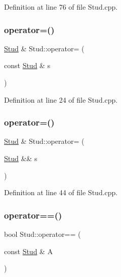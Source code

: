 Definition at line 76 of file Stud.\+cpp.

\mbox{\label{class_stud_a94d010cba4832e52eea069005bf7db04}} 
\subsubsection{\texorpdfstring{operator=()}{operator=()}\hspace{0.1cm}{\footnotesize\ttfamily [1/2]}}
{\footnotesize\ttfamily \mbox{\hyperlink{class_stud}{Stud}} \& Stud\+::operator= (\begin{DoxyParamCaption}\item[{const \mbox{\hyperlink{class_stud}{Stud}} \&}]{s }\end{DoxyParamCaption})}



Definition at line 24 of file Stud.\+cpp.

\mbox{\label{class_stud_af5458aac5c975c0b6e35a40fac81756d}} 
\subsubsection{\texorpdfstring{operator=()}{operator=()}\hspace{0.1cm}{\footnotesize\ttfamily [2/2]}}
{\footnotesize\ttfamily \mbox{\hyperlink{class_stud}{Stud}} \& Stud\+::operator= (\begin{DoxyParamCaption}\item[{\mbox{\hyperlink{class_stud}{Stud}} \&\&}]{s }\end{DoxyParamCaption})\hspace{0.3cm}{\ttfamily [noexcept]}}



Definition at line 44 of file Stud.\+cpp.

\mbox{\label{class_stud_ab6f87c50382f7662173f363b012fd0b9}} 
\subsubsection{\texorpdfstring{operator==()}{operator==()}}
{\footnotesize\ttfamily bool Stud\+::operator== (\begin{DoxyParamCaption}\item[{const \mbox{\hyperlink{class_stud}{Stud}} \&}]{A }\end{DoxyParamCaption})}



